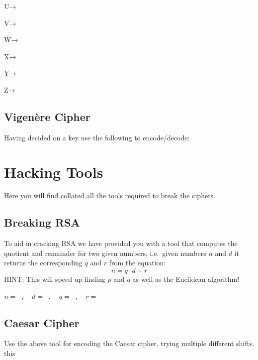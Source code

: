 \documentclass[
  letterpaper,
  DIV=11,
  numbers=noendperiod]{scrreprt}
\begin{document}
\hypertarget{du}{}
U→

\hypertarget{dv}{}
V→

\hypertarget{dw}{}
W→

\hypertarget{dx}{}
X→

\hypertarget{dy}{}
Y→

\hypertarget{dz}{}
Z→

\hypertarget{decode-remaining}{}

\hypertarget{container}{}
\hypertarget{content}{}

\hypertarget{vigenuxe8re-cipher-1}{%
\subsection{Vigenère Cipher}\label{vigenuxe8re-cipher-1}}

Having decided on a key use the following to encode/decode:

\hypertarget{hacking-tools}{%
\section{Hacking Tools}\label{hacking-tools}}

Here you will find collated all the tools required to break the ciphers.

\hypertarget{breaking-rsa}{%
\subsection{Breaking RSA}\label{breaking-rsa}}

To aid in cracking RSA we have provided you with a tool that computes
the quotient and remainder for two given numbers, i.e.~given numbers
\(n\) and \(d\) it returns the corresponding \(q\) and \(r\) from the
equation: \begin{equation*}
    n = q\cdot d + r
\end{equation*} HINT: This will speed up finding \(p\) and \(q\) as well
as the Euclidean algorithm!

\emph{n} = ~, ~ \emph{d} = ~, ~ \emph{q} =
~\protect\hypertarget{qh-calc}{}{}, ~ \emph{r} =
~\protect\hypertarget{rh-calc}{}{}

\hypertarget{caesar-cipher-1}{%
\subsection{Caesar Cipher}\label{caesar-cipher-1}}

Use the above tool for encoding the Caesar cipher, trying multiple
different shifts. this
\end{document}
